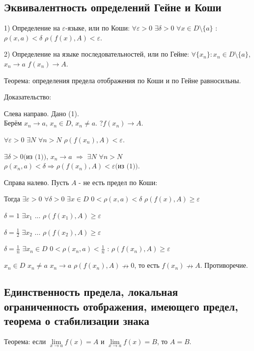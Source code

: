 \newpage
{}
\subsection{Эквивалентность определений Гейне и Коши}

1) Определение на $\varepsilon$-языке, или по Коши: $\forall \varepsilon > 0$ $\exists \delta > 0$ $\forall x \in D \setminus \{a\}$ : $\rho(x, a) < \delta$ $\rho(f(x), A) < \varepsilon$.

2) Определение на языке последовательностей, или по Гейне: $\forall \{x_n\} : x_n \in D \setminus \{a\}$, $x_n \rightarrow a$ $f(x_n) \rightarrow A$.

Теорема: определения предела отображения по Коши и по Гейне равносильны.

Доказательство:

Слева направо. Дано (1). \\
Берём $x_n \rightarrow a$, $x_n \in D$, $x_n \neq a$. ?$f(x_n) \rightarrow A$. 

$\forall \varepsilon > 0$ $\exists N$ $\forall n > N$ $\rho(f(x_n), A) < \varepsilon$.

$\exists \delta > 0 \text{(из (1))}$, $x_n \rightarrow a$ $\Rightarrow$ $\exists N$ $\forall n > N$ $\rho(x_n, a) < \delta \Rightarrow \rho(f(x_n), A) < \varepsilon \text{(из (1))}$.

Справа налево. Пусть $A$ - не есть предел по Коши:

Тогда $\exists \varepsilon > 0$ $\forall \delta > 0$ $\exists x \in D$ $0 < \rho(x, a) < \delta$ $\rho(f(x), A) \geq \varepsilon$

$\delta = 1$ $\exists x_1$ ... $\rho(f(x_1), A) \geq \varepsilon$

$\delta = \frac{1}{2}$ $\exists x_2$ ... $\rho(f(x_2), A) \geq \varepsilon$

$\delta = \frac{1}{n}$ $\exists x_n \in D$ $0 < \rho(x_n, a) < \frac{1}{n}$ :  $\rho(f(x_n), A) \geq \varepsilon$

$x_n \in D$ $x_n \neq a$ $x_n \rightarrow a$ $\rho(f(x_n), A) \nrightarrow 0$, то есть $f(x_n) \nrightarrow A$. Противоречие.

\newpage
\subsection{Единственность предела, локальная ограниченность отображения, имеющего предел, теорема о стабилизации знака}

Теорема: если $\lim\limits_{x \to a} f(x) = A$ и $\lim\limits_{x \to a} f(x) = B$, то $A = B$.


